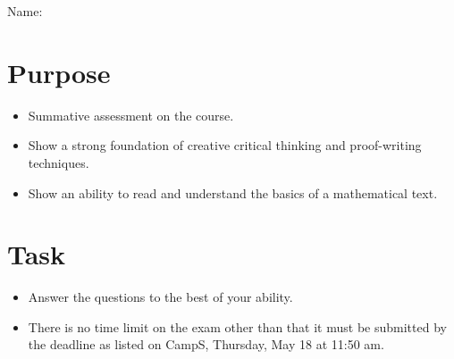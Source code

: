 \documentclass[12pt]{article}
\begin{document}
	\hfill Name: \underline{\hspace*{2in}}
	\section*{Purpose}
		\begin{itemize}
			\item Summative assessment on the course.
			\item Show a strong foundation of creative critical thinking and proof-writing techniques.
			\item Show an ability to read and understand the basics of a mathematical text.
		\end{itemize}
	\section*{Task}
		\begin{itemize}
			\item Answer the questions to the best of your ability.
			\item There is no time limit on the exam other than that it must be submitted by the deadline as listed on CampS, Thursday, May 18 at 11:50 am.
		\end{itemize}
\end{document}
